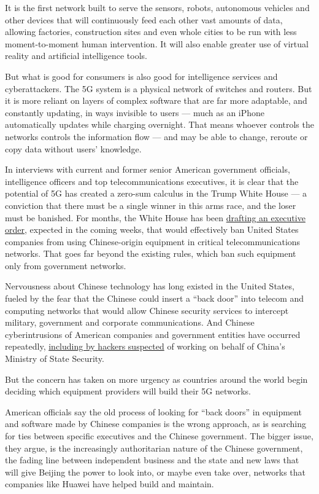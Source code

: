 It is the first network built to serve the sensors, robots, autonomous
vehicles and other devices that will continuously feed each other vast
amounts of data, allowing factories, construction sites and even whole
cities to be run with less moment-to-moment human intervention. It will
also enable greater use of virtual reality and artificial intelligence
tools.

But what is good for consumers is also good for intelligence services
and cyberattackers. The 5G system is a physical network of switches and
routers. But it is more reliant on layers of complex software that are
far more adaptable, and constantly updating, in ways invisible to users
--- much as an iPhone automatically updates while charging overnight.
That means whoever controls the networks controls the information flow
--- and may be able to change, reroute or copy data without users'
knowledge.

In interviews with current and former senior American government
officials, intelligence officers and top telecommunications executives,
it is clear that the potential of 5G has created a zero-sum calculus in
the Trump White House --- a conviction that there must be a single
winner in this arms race, and the loser must be banished. For months,
the White House has been
\href{https://www.nytimes.com/2018/12/11/us/politics/trump-china-trade.html}{drafting
an executive order}, expected in the coming weeks, that would
effectively ban United States companies from using Chinese-origin
equipment in critical telecommunications networks. That goes far beyond
the existing rules, which ban such equipment only from government
networks.

Nervousness about Chinese technology has long existed in the United
States, fueled by the fear that the Chinese could insert a ``back door''
into telecom and computing networks that would allow Chinese security
services to intercept military, government and corporate communications.
And Chinese cyberintrusions of American companies and government
entities have occurred repeatedly,
\href{https://www.nytimes.com/2018/12/20/us/politics/us-and-other-nations-to-announce-china-crackdown.html}{including
by hackers suspected} of working on behalf of China's Ministry of State
Security.

But the concern has taken on more urgency as countries around the world
begin deciding which equipment providers will build their 5G networks.

American officials say the old process of looking for ``back doors'' in
equipment and software made by Chinese companies is the wrong approach,
as is searching for ties between specific executives and the Chinese
government. The bigger issue, they argue, is the increasingly
authoritarian nature of the Chinese government, the fading line between
independent business and the state and new laws that will give Beijing
the power to look into, or maybe even take over, networks that companies
like Huawei have helped build and maintain.

